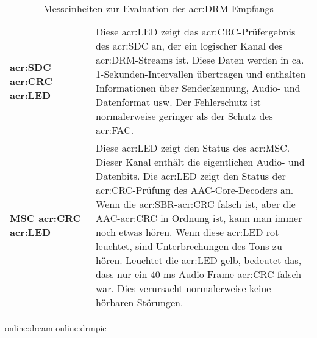 \begin{table}[h]
\begin{center}
\begin{tabular}{p{0.28\linewidth}  p{0.72\linewidth}}
			\textbf{\gls{acr:SDC} \gls{acr:CRC} \gls{acr:LED}} & 	Diese \gls{acr:LED} zeigt das \gls{acr:CRC}-Prüfergebnis des \gls{acr:SDC} an, der ein logischer Kanal des \gls{acr:DRM}-Streams ist. Diese Daten werden in ca. 1-Sekunden-Intervallen übertragen und enthalten Informationen über Senderkennung, Audio- und Datenformat usw. Der Fehlerschutz ist normalerweise geringer als der Schutz des \gls{acr:FAC}. \\
			
			\textbf{MSC \gls{acr:CRC} \gls{acr:LED}} & Diese \gls{acr:LED} zeigt den Status des \gls{acr:MSC}. Dieser Kanal enthält die eigentlichen Audio- und Datenbits. Die \gls{acr:LED} zeigt den Status der \gls{acr:CRC}-Prüfung des AAC-Core-Decoders an.  Wenn die \gls{acr:SBR}-\gls{acr:CRC} falsch ist, aber die AAC-\gls{acr:CRC} in Ordnung ist, kann man immer noch etwas hören. Wenn diese \gls{acr:LED} rot leuchtet, sind Unterbrechungen des Tons zu hören. Leuchtet die \gls{acr:LED} gelb, bedeutet das, dass nur ein 40 ms Audio-Frame-\gls{acr:CRC} falsch war. Dies verursacht normalerweise keine hörbaren Störungen.\\
			\bottomrule
		\end{tabular}
		\caption{Messeinheiten zur Evaluation des \gls{acr:DRM}-Empfangs}
		\gls{online:dream}
		\label{tab:drmmess}\gls{online:drmpic}
	\end{center}
\end{table}


